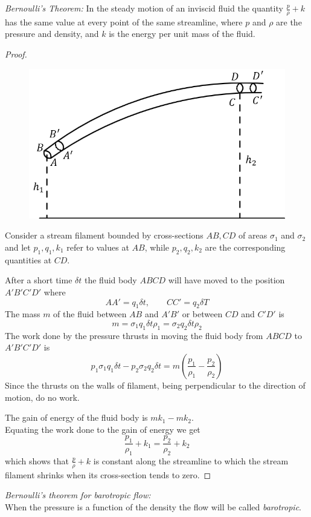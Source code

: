 \documentclass[12pt]{article}
\begin{document}
\begin{soln}
    
    \emph{Bernoulli's Theorem:} In the steady motion of an inviscid fluid the quantity $ \frac{p}{\rho}+k $ has the same value at every point of the same streamline, where $ p $ and $ \rho $ are the pressure and density, and $ k $ is the energy per unit mass of the fluid.
    \begin{proof}
        \hfill
        \begin{figure}[H]
            \centering
            \includegraphics[scale=1]{img/ass-1-3.1.png}
        \end{figure}
        Consider a stream filament bounded by cross-sections $ AB,CD $ of areas $ \sigma_1 $ and $ \sigma_2 $ and let $ p_1,q_1,k_1 $ refer to values at $ AB $, while $ p_2,q_2,k_2 $ are the corresponding quantities at $ CD $.

        After a short time $ \delta t $ the fluid body $ ABCD $ will have moved to the position $ A'B'C'D' $ where
        \[AA'=q_1\delta t,\qquad CC'=q_2\delta T\]
        The mass $ m $ of the fluid between $ AB $ and $ A'B' $ or between $ CD $ and $ C'D' $ is 
        \[
            m=\sigma_1q_1\delta t \rho_1=\sigma_2q_2\delta t \rho_2
        \]
        The work done by the pressure thrusts in moving the fluid body from $ ABCD $ to $ A'B'C'D' $ is 
        \[
            p_1\sigma_1q_1\delta t-p_2\sigma_2q_2\delta t=m\left( \frac{p_1}{\rho_1}-\frac{p_2}{\rho_2} \right)
        \]
        Since the thrusts on the walls of filament, being perpendicular to the direction of motion, do no work.

        The gain of energy of the fluid body is $ mk_1-mk_2 $.\\
        Equating the work done to the gain of energy we get
        \[
            \frac{p_1}{\rho_1}+k_1=\frac{p_2}{\rho_2}+k_2
        \]
        which shows that $ \frac{p}{\rho}+k $ is constant along the streamline to which the stream filament shrinks when its cross-section tends to zero.
    \end{proof}
    \emph{Bernoulli's theorem for barotropic flow:}\\
    When the pressure is a function of the density the flow will be called \emph{barotropic}.


\end{soln}
\end{document}
